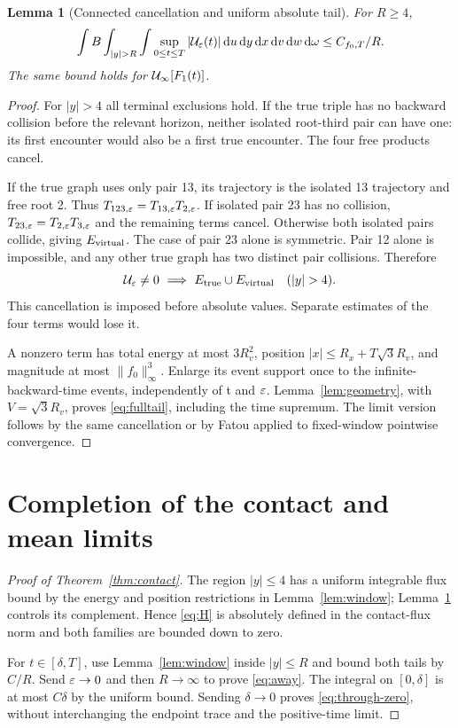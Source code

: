 \documentclass[11pt,letterpaper]{article}
\newtheorem{lemma}[theorem]{Lemma}
\theoremstyle{remark}\newtheorem{remark}[theorem]{Remark}
\numberwithin{equation}{section}
\begin{document}
\begin{lemma}[Connected cancellation and uniform absolute tail]\label{lem:tail}
For $R\ge4$,
\begin{equation}\label{eq:fulltail}
 \int B\int_{|y|>R}\int\sup_{0\le t\le T}|\U_\eps(t)|
                  \dd u\dd y\dd x\dd v\dd w\dd\omega\le C_{f_0,T}/R.
\end{equation}
The same bound holds for $\mathcal U_\infty[F_1(t)]$.
\end{lemma}
\begin{proof}
For $|y|>4$ all terminal exclusions hold. If the true triple has no backward collision before the relevant horizon, neither isolated root-third pair can have one: its first encounter would also be a first true encounter. The four free products cancel.

If the true graph uses only pair 13, its trajectory is the isolated 13 trajectory and free root 2. Thus $T_{123,\varepsilon}=T_{13,\varepsilon}T_{2,\varepsilon}$. If isolated pair 23 has no collision, $T_{23,\varepsilon}=T_{2,\varepsilon}T_{3,\varepsilon}$ and the remaining terms cancel. Otherwise both isolated pairs collide, giving $E_{\rm virtual}$. The case of pair 23 alone is symmetric. Pair 12 alone is impossible, and any other true graph has two distinct pair collisions. Therefore
\[
 \U_\eps\ne0\ \Longrightarrow\ E_{\rm true}\cup E_{\rm virtual}\quad (|y|>4).
\]
This cancellation is imposed before absolute values. Separate estimates of the four terms would lose it.

A nonzero term has total energy at most $3R_v^2$, position $|x|\le R_x+T\sqrt3R_v$, and magnitude at most $\|f_0\|_\infty^3$. Enlarge its event support once to the infinite-backward-time events, independently of t and $\varepsilon$. Lemma~\ref{lem:geometry}, with $V=\sqrt3R_v$, proves \eqref{eq:fulltail}, including the time supremum. The limit version follows by the same cancellation or by Fatou applied to fixed-window pointwise convergence.
\end{proof}

\section{Completion of the contact and mean limits}
\begin{proof}[Proof of Theorem~\ref{thm:contact}]
The region $|y|\le4$ has a uniform integrable flux bound by the energy and position restrictions in Lemma~\ref{lem:window}; Lemma~\ref{lem:tail} controls its complement. Hence \eqref{eq:H} is absolutely defined in the contact-flux norm and both families are bounded down to zero.

For $t\in[\delta,T]$, use Lemma~\ref{lem:window} inside $|y|\le R$ and bound both tails by $C/R$. Send $\varepsilon\to0$ and then $R\to\infty$ to prove \eqref{eq:away}. The integral on $[0,\delta]$ is at most $C\delta$ by the uniform bound. Sending $\delta\to0$ proves \eqref{eq:through-zero}, without interchanging the endpoint trace and the positive-time limit.
\end{proof}
\end{document}
